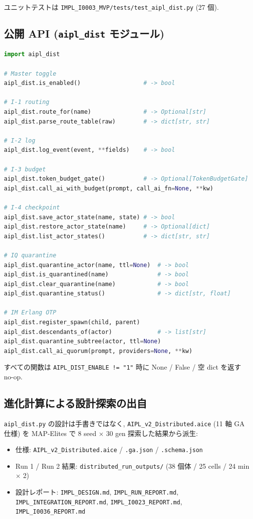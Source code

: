 \documentclass[11pt,a4paper]{article}
\begin{document}
ユニットテストは \texttt{IMPL\_I0003\_MVP/tests/test\_aipl\_dist.py} (27 個).

\subsection{公開 API (\texttt{aipl\_dist} モジュール)}

\begin{lstlisting}[language=Python]
import aipl_dist

# Master toggle
aipl_dist.is_enabled()                  # -> bool

# I-1 routing
aipl_dist.route_for(name)               # -> Optional[str]
aipl_dist.parse_route_table(raw)        # -> dict[str, str]

# I-2 log
aipl_dist.log_event(event, **fields)    # -> bool

# I-3 budget
aipl_dist.token_budget_gate()           # -> Optional[TokenBudgetGate]
aipl_dist.call_ai_with_budget(prompt, call_ai_fn=None, **kw)

# I-4 checkpoint
aipl_dist.save_actor_state(name, state) # -> bool
aipl_dist.restore_actor_state(name)     # -> Optional[dict]
aipl_dist.list_actor_states()           # -> dict[str, str]

# IQ quarantine
aipl_dist.quarantine_actor(name, ttl=None)  # -> bool
aipl_dist.is_quarantined(name)              # -> bool
aipl_dist.clear_quarantine(name)            # -> bool
aipl_dist.quarantine_status()               # -> dict[str, float]

# IM Erlang OTP
aipl_dist.register_spawn(child, parent)
aipl_dist.descendants_of(actor)             # -> list[str]
aipl_dist.quarantine_subtree(actor, ttl=None)
aipl_dist.call_ai_quorum(prompt, providers=None, **kw)
\end{lstlisting}

すべての関数は \texttt{AIPL\_DIST\_ENABLE != "1"} 時に None / False / 空 dict を返す no-op.

\subsection{進化計算による設計探索の出自}

\texttt{aipl\_dist.py} の設計は手書きではなく,
\texttt{AIPL\_v2\_Distributed.aice} (11 軸 GA 仕様) を MAP-Elites で
8 seed $\times$ 30 gen 探索した結果から派生:

\begin{itemize}\setlength{\itemsep}{0pt}
\item 仕様: \texttt{AIPL\_v2\_Distributed.aice} / \texttt{.ga.json} / \texttt{.schema.json}
\item Run 1 / Run 2 結果: \texttt{distributed\_run\_outputs/} (38 個体 / 25 cells / 24 min $\times$ 2)
\item 設計レポート: \texttt{IMPL\_DESIGN.md}, \texttt{IMPL\_RUN\_REPORT.md},
\texttt{IMPL\_INTEGRATION\_REPORT.md}, \texttt{IMPL\_I0023\_REPORT.md},
\texttt{IMPL\_I0036\_REPORT.md}
\end{itemize}
\end{document}
